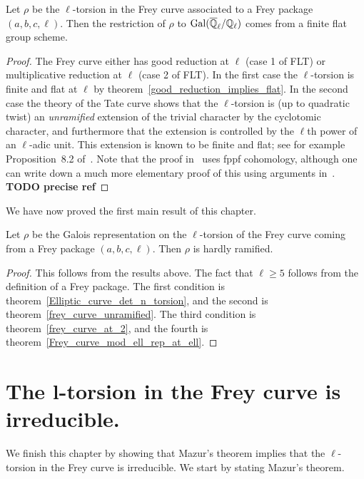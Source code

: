 \begin{theorem}\label{Frey_curve_mod_ell_rep_at_ell} Let $\rho$ be the $\ell$-torsion in the
  Frey curve associated to a Frey package $(a,b,c,\ell)$. Then the restriction of $\rho$ to $\operatorname{Gal}(\overline{\mathbb{Q}}_\ell/\mathbb{Q}_\ell)$ comes from a finite flat group scheme.
\end{theorem}
\begin{proof} The Frey curve either has good reduction at $\ell$ (case 1 of FLT) or multiplicative 
  reduction at $\ell$ (case 2 of FLT). In the first case the $\ell$-torsion is finite and flat
  at $\ell$ by theorem~\ref{good_reduction_implies_flat}. In the second case the theory of the Tate
   curve shows that the $\ell$-torsion is (up to quadratic twist) an \emph{unramified} extension of
    the trivial character by the cyclotomic character, and furthermore that the extension is 
    controlled
  by the $\ell$th power of an $\ell$-adic unit. This extension is known to be finite and flat;
  see for example Proposition~8.2 of~\cite{edix}. Note that the proof in~\cite{edix} uses
  fppf cohomology, although one can write down a much more elementary proof of this using
  arguments in~\cite{katz-mazur}. {\bf TODO precise ref}
\end{proof}

We have now proved the first main result of this chapter.

\begin{theorem}\label{frey_curve_hardly_ramified} Let $\rho$ be the Galois representation on the 
  $\ell$-torsion of the Frey curve coming from a Frey package $(a,b,c,\ell)$. Then $\rho$ is hardly 
  ramified.
\end{theorem}
\begin{proof}
  This follows from the results above. The fact that $\ell\geq 5$ follows from the definition of
  a Frey package. The first condition is theorem~\ref{Elliptic_curve_det_n_torsion},
  and the second is theorem~\ref{frey_curve_unramified}. The third condition is
  theorem~\ref{frey_curve_at_2}, and the fourth is theorem~\ref{Frey_curve_mod_ell_rep_at_ell}.
\end{proof}

\section{The l-torsion in the Frey curve is irreducible.}

We finish this chapter by showing that Mazur's theorem implies that the $\ell$-torsion in the Frey
 curve is irreducible. We start by stating Mazur's theorem.

